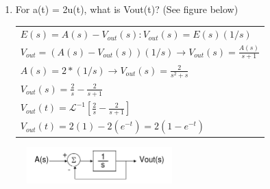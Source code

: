 \documentclass{article}
\newcommand{\Lagr}{\mathcal{L}}
\begin{document}
\begin{multicols}{2}
\begin{enumerate}
\item\label{p6}
For a(t) = 2u(t), what is Vout(t)? (See figure below)
	
\begin{tabular}{ l }
	$E(s) = A(s) - V_{out}(s) \colon V_{out}(s) = E(s)(1/s)$\\
	$V_{out} = (A(s) - V_{out}(s))(1/s) \rightarrow V_{out}(s) = \frac{A(s)}{s+1}$\\
	$A(s) = 2*(1/s) \rightarrow V_{out}(s) = \frac{2}{s^2 + s}$\\
	$V_{out}(s) = \frac{2}{s} - \frac{2}{s+1}$\\
	$V_{out}(t) = \Lagr^{-1}[\frac{2}{s} - \frac{2}{s+1}]$\\
	$V_{out}(t) = 2(1) - 2(e^{-t}) = 2(1-e^{-t})$

\end{tabular}

\end{enumerate}
\end{multicols}

\begin{figure}[h]
	\centering
	\includegraphics[keepaspectratio,width=0.50\textwidth]{control}
\end{figure}

\label{end}
\end{document}
